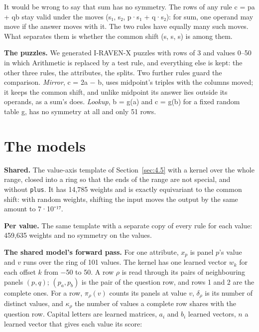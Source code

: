 It would be wrong to say that sum has no symmetry. The rows of any rule c = pa + qb stay valid under the moves (s₁, s₂, p·s₁ + q·s₂): for sum, one operand may move if the answer moves with it. The two rules have equally many such moves. What separates them is whether the common shift (s, s, s) is among them.

\textbf{The puzzles.} We generated I-RAVEN-X puzzles with rows of 3 and values 0–50 in which Arithmetic is replaced by a test rule, and everything else is kept: the other three rules, the attributes, the splits. Two further rules guard the comparison. \emph{Mirror}, c = 2a − b, uses midpoint's triples with the columns moved; it keeps the common shift, and unlike midpoint its answer lies outside its operands, as a sum's does. \emph{Lookup}, b = g(a) and c = g(b) for a fixed random table g, has no symmetry at all and only 51 rows.

\section{The models}\label{sec:7.2}

\textbf{Shared.} The value-axis template of Section~\ref{sec:4.5} with a kernel over the whole range, closed into a ring so that the ends of the range are not special, and without \texttt{plus}. It has 14,785 weights and is exactly equivariant to the common shift: with random weights, shifting the input moves the output by the same amount to 7·10⁻¹⁷.

\textbf{Per value.} The same template with a separate copy of every rule for each value: 459,635 weights and no symmetry on the values.

\textbf{The shared model's forward pass.} For one attribute, \(x_p\) is panel \(p\)'s value and \(v\) runs over the ring of 101 values. The kernel has one learned vector \(w_k\) for each offset \(k\) from −50 to 50. A row \(\rho\) is read through its pairs of neighbouring panels \((p, q)\); \((p_a, p_b)\) is the pair of the question row, and rows 1 and 2 are the complete ones. For a row, \(\pi_\rho(v)\) counts its panels at value \(v\), \(\delta_\rho\) is its number of distinct values, and \(\kappa_\rho\) the number of values a complete row shares with the question row. Capital letters are learned matrices, \(a_i\) and \(b_i\) learned vectors, \(n\) a learned vector that gives each value its score:

